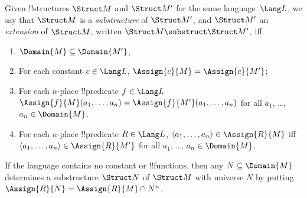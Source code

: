 \documentclass[../../include/open-logic-section]{subfiles}
\begin{document}

\begin{defn}
Given !!{structure}s $\Struct M$ and $\Struct M'$ for the same language~$\Lang L$,
we say that $\Struct M$ is a \emph{substructure} of $\Struct M'$, and
$\Struct M'$ an \emph{extension} of $\Struct M$, written $\Struct M
\substruct \Struct M'$, iff
\begin{enumerate}
\item $\Domain{M} \subseteq \Domain{M'}$,
\item For each constant $c \in \Lang L$, $\Assign{c}{M} =
    \Assign{c}{M'}$;
\item For each $n$-place !!{predicate} $f \in \Lang L$
  $\Assign{f}{M}(a_1, \dots, a_n) = \Assign{f}{M'}(a_1, \dots, a_n)$
  for all $a_1$, \dots, $a_n \in \Domain{M}$.
\item For each $n$-place !!{predicate} $R \in \Lang L$, $\langle
  a_1, \dots, a_n\rangle \in \Assign{R}{M}$ iff $\langle a_1, \dots,
  a_n\rangle \in \Assign{R}{M'}$ for all $a_1$, \dots, $a_n \in
  \Domain{M}$.
\end{enumerate}
\end{defn}

\begin{rem}
If the language contains no constant or !!{function}s, then any $N
\subseteq \Domain{M}$ determines a substructure $\Struct N$ of
$\Struct M$ with universe $N$ by putting $\Assign{R}{N} =
\Assign{R}{M} \cap N^n$.
\end{rem}

\end{document}
